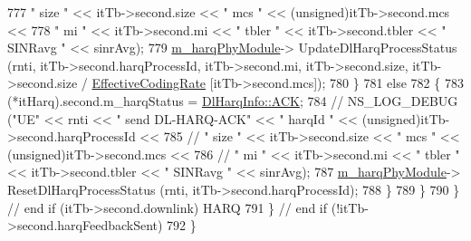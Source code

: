 \begin{DoxyCode}
777                                                                                                                         \textcolor{stringliteral}{
      " size "} << itTb->second.size << \textcolor{stringliteral}{" mcs "} << (\textcolor{keywordtype}{unsigned})itTb->second.mcs <<
778                                                                                                                         \textcolor{stringliteral}{
      " mi "} << itTb->second.mi << \textcolor{stringliteral}{" tbler "} << itTb->second.tbler << \textcolor{stringliteral}{" SINRavg "} << sinrAvg);
779                                                                 \hyperlink{classns3_1_1MmWaveSpectrumPhy_a88d377424f8b4ca9745807ef3281e010}{m\_harqPhyModule}->
      UpdateDlHarqProcessStatus (rnti, itTb->second.harqProcessId, itTb->second.mi, itTb->second.size, itTb->second.size / 
      \hyperlink{namespacens3_af70af4887722b3badf3d57ca573d9502}{EffectiveCodingRate} [itTb->second.mcs]);
780                                                         \}
781                                                         \textcolor{keywordflow}{else}
782                                                         \{
783                                                                 (*itHarq).second.m\_harqStatus = 
      \hyperlink{structns3_1_1DlHarqInfo_a922d2bc13ae01f93cde1a8b4bfccad14a8d3ab99ad8902cfbc5929336966de3ef}{DlHarqInfo::ACK};
784 \textcolor{comment}{//                                                              NS\_LOG\_DEBUG ("UE" << rnti << " send
       DL-HARQ-ACK" << " harqId " << (unsigned)itTb->second.harqProcessId <<}
785 \textcolor{comment}{//                                                                            " size " << itTb->second.size
       << " mcs " << (unsigned)itTb->second.mcs <<}
786 \textcolor{comment}{//                                                                            " mi " << itTb->second.mi <<
       " tbler " << itTb->second.tbler << " SINRavg " << sinrAvg);}
787                                                                 \hyperlink{classns3_1_1MmWaveSpectrumPhy_a88d377424f8b4ca9745807ef3281e010}{m\_harqPhyModule}->
      ResetDlHarqProcessStatus (rnti, itTb->second.harqProcessId);
788                                                         \}
789                                                 \}
790                                         \} \textcolor{comment}{// end if (itTb->second.downlink) HARQ}
791                                 \} \textcolor{comment}{// end if (!itTb->second.harqFeedbackSent)}
792                         \}

\end{DoxyCode}
